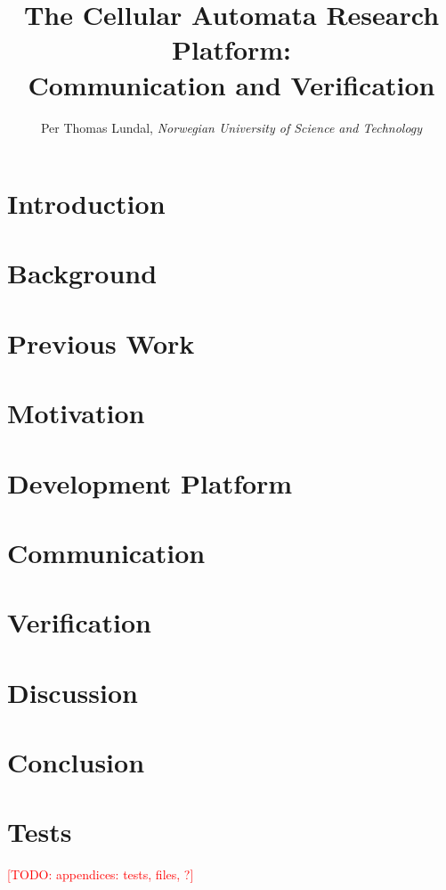 \documentclass[a4paper]{IEEEtran}
\title{The Cellular Automata Research Platform: \\ Communication and Verification}
\author{Per Thomas Lundal, \emph{Norwegian University of Science and Technology}}
\newcommand\todo[1]{\textcolor{red}{[TODO: #1]}}
\begin{document}
\maketitle

\begin{abstract}

    

\end{abstract}

\section{Introduction}

    

\section{Background}
    \label{sec:background}
    

\section{Previous Work}
    \label{sec:previous-work}
    

\section{Motivation}
    \label{sec:motivation}
    

\section{Development Platform}
    \label{sec:development}
    

\section{Communication}
    \label{sec:communication}
    

\section{Verification}
    \label{sec:verification}
    

\section{Discussion}
    \label{sec:discussion}
    

\section{Conclusion}
    \label{sec:conclusion}
    

\appendices

\section{Tests}
    \label{sec:tests}
    




\todo{appendices: tests, files, ?}
\end{document}
